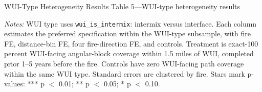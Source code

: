 \documentclass[10pt,aspectratio=169]{beamer}
\begin{document}
\begin{frame}{WUI-Type Heterogeneity Results}
  \centering
  {\small Table 5---WUI-type heterogeneity results}

  \vspace{0.1em}
  \small
  \setlength{\tabcolsep}{2.8pt}
  \renewcommand{\arraystretch}{1.0}
  \vspace{0.15em}

  \begin{minipage}{0.985\textwidth}
    \tiny
  \textit{Notes:} WUI type uses \texttt{wui\_is\_intermix}: intermix versus interface. Each column estimates the preferred specification within the WUI-type subsample, with fire FE, distance-bin FE, four fire-direction FE, and controls. Treatment is exact-100 percent WUI-facing angular-block coverage within 1.5 miles of WUI, completed prior 1--5 years before the fire. Controls have zero WUI-facing path coverage within the same WUI type. Standard errors are clustered by fire. Stars mark p-values: *** p $<$ 0.01; ** p $<$ 0.05; * p $<$ 0.10.
  \end{minipage}
  \renewcommand{\arraystretch}{1}
\end{frame}
\end{document}
